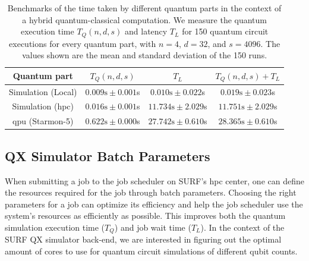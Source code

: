 \begin{table}[ht]
    \centering
    {\renewcommand{\arraystretch}{1.35}
        \begin{tabular}{ c|c|c|c }
            Quantum part & $T_Q(n, d, s)$ & $T_L$ & $T_Q(n, d, s) + T_L$ \\
            \hline
            Simulation (Local) & $0.009\text{s} \pm 0.001$s & $0.010 \text{s} \pm 0.022$s & $0.019 \text{s} \pm 0.023$s \\
            Simulation (\gls{hpc}) & $0.016\text{s} \pm 0.001$s & $11.734\text{s} \pm 2.029$s & $11.751\text{s} \pm 2.029$s \\
            \gls{qpu} (Starmon-5) & $0.622\text{s} \pm 0.000$s & $27.742\text{s} \pm 0.610$s & $28.365\text{s} \pm 0.610$s \\
        \end{tabular}
    }
    \caption[Benchmarks of the time taken by different quantum parts in the context of a hybrid quantum-classical computation.]{
        Benchmarks of the time taken by different quantum parts in the context of a hybrid quantum-classical computation.
        We measure the quantum execution time $T_Q(n, d, s)$ and latency $T_L$ for 150 quantum circuit executions for every quantum part, with $n = 4$, $d = 32$, and $s = 4096$.
        The values shown are the mean and standard deviation of the 150 runs.
    }
    \label{table:baseline-benchmark}
\end{table}

\subsection{QX Simulator Batch Parameters}
When submitting a job to the job scheduler on SURF's \gls{hpc} center, one can define the resources required for the job through batch parameters.
Choosing the right parameters for a job can optimize its efficiency and help the job scheduler use the system's resources as efficiently as possible.
This improves both the quantum simulation execution time ($T_Q$) and job wait time ($T_L$).
In the context of the SURF QX simulator back-end, we are interested in figuring out the optimal amount of cores to use for quantum circuit simulations of different qubit counts.

